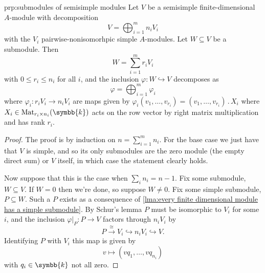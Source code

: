 \documentclass[fleqn]{NotesClass}
\renewcommand{\field}{\symbb{k}}
\newcommand{\action}{\mathbin{.}}
\newcommand{\isomorphic}{\cong}
\begin{document}
    \begin{prp}{}{prp:submodules of semisimple modules}
        Let \(V\) be a semisimple finite-dimensional \(A\)-module with decomposition
        \begin{equation}
            V = \bigoplus_{i=1}^m n_i V_i
        \end{equation}
        with the \(V_i\) pairwise-nonisomorhpic simple \(A\)-modules.
        Let \(W \subseteq V\) be a submodule.
        Then
        \begin{equation}
            W = \sum_{i=1}^m r_i V_i
        \end{equation}
        with \(0 \le r_i \le n_i\) for all \(i\), and the inclusion \(\varphi \colon W \hookrightarrow V\) decomposes as
        \begin{equation}
            \varphi = \bigoplus_{i=1}^m \varphi_i
        \end{equation}
        where \(\varphi_i \colon r_i V_i \to n_i V_i\) are maps given by \(\varphi_i(v_1, \dotsc, v_{r_i}) = (v_1, \dotsc, v_{r_i}) \action X_i\) where \(X_i \in \matrices[r_i]{n_i}{\field}\) acts on the row vector by right matrix multiplication and has rank \(r_i\).
        \begin{proof}
            The proof is by induction on \(n = \sum_{i=1}^m n_i\).
            For the base case we just have that \(V\) is simple, and so its only submodules are the zero module (the empty direct sum) or \(V\) itself, in which case the statement clearly holds.
            
            Now suppose that this is the case when \(\sum_{i} n_i = n - 1\).
            Fix some submodule, \(W \subseteq V\).
            If \(W = 0\) then we're done, so suppose \(W \ne 0\).
            Fix some simple submodule, \(P \subseteq W\).
            Such a \(P\) exists as a consequence of \cref{lma:every finite dimensional module has a simple submodule}.
            By Schur's lemma \(P\) must be isomorphic to \(V_i\) for some \(i\), and the inclusion \(\varphi|_P \colon P \to V\) factors through \(n_i V_i\) by
            \begin{equation}
                P \xrightarrow{\isomorphic} V_i \hookrightarrow n_i V_i \hookrightarrow V.
            \end{equation}
            Identifying \(P\) with \(V_i\) this map is given by
            \begin{equation}
                v \mapsto (v q_1, \dotsc, v q_{n_i})
            \end{equation}
            with \(q_i \in \field\) not all zero.
            

\end{proof}
\end{prp}
\end{document}
